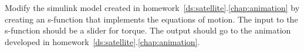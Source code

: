 
Modify the simulink model created in homework~\ref{ds:satellite}.\ref{chap:animation} by creating an s-function that implements the equations of motion.  The input to the s-function should be a slider for torque.  The output should go to the animation developed in homework~\ref{ds:satellite}.\ref{chap:animation}.
